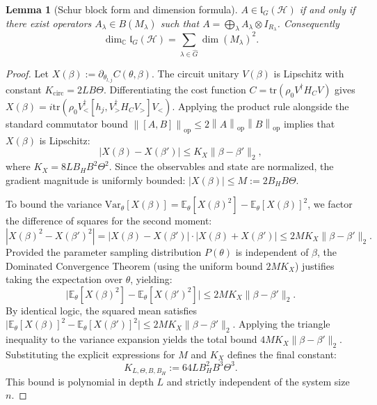 \documentclass[10pt,twocolumn]{article}
\newtheorem{lemma}[definition]{Lemma}
\theoremstyle{remark}
\newcommand{\Hil}{\mathcal{H}}
\newcommand{\lG}{\mathfrak{l}_G(\Hil)}
\newcommand{\opnorm}[1]{\left\lVert #1 \right\rVert_{\mathrm{op}}}
\begin{document}
\begin{lemma}[Schur block form and dimension formula]
\label{lem:schur}
$A \in \lG$ if and only if there exist operators $A_\lambda \in B(M_\lambda)$ such that $A = \bigoplus_\lambda A_\lambda \otimes I_{R_\lambda}$. Consequently
\begin{equation}
\dim_{\mathbb{C}} \lG = \sum_{\lambda \in \hat G} \dim(M_\lambda)^2. \label{eq:2}
\end{equation}
\end{lemma}
\begin{proof}
Let $X(\beta) := \partial_{\theta_{l,j}} C(\theta,\beta)$. The circuit unitary $V(\beta)$ is Lipschitz with constant $K_{\text{circ}} = 2LB\Theta$. Differentiating the cost function $C = \mathrm{tr}(\rho_0 V^\dagger H_C V)$ gives $X(\beta) = i \mathrm{tr}(\rho_0 V_{<}^\dagger [h_j, V_{>}^\dagger H_C V_{>}] V_{<})$. Applying the product rule alongside the standard commutator bound $\opnorm{[A,B]} \le 2\opnorm{A}\opnorm{B}$ implies that $X(\beta)$ is Lipschitz:
\begin{equation*}
|X(\beta) - X(\beta')| \le K_X \lVert \beta - \beta' \rVert_2,
\end{equation*}
where $K_X = 8 L B_H B^2 \Theta^2$. 
Since the observables and state are normalized, the gradient magnitude is uniformly bounded: $|X(\beta)| \le M := 2 B_H B \Theta$.

To bound the variance $\mathrm{Var}_\theta[X(\beta)] = \mathbb{E}_\theta[X(\beta)^2] - \mathbb{E}_\theta[X(\beta)]^2$, we factor the difference of squares for the second moment:
\begin{equation*}
|X(\beta)^2 - X(\beta')^2| = |X(\beta) - X(\beta')| \cdot |X(\beta) + X(\beta')| \le 2M K_X \lVert \beta - \beta' \rVert_2.
\end{equation*}
Provided the parameter sampling distribution $P(\theta)$ is independent of $\beta$, the Dominated Convergence Theorem (using the uniform bound $2M K_X$) justifies taking the expectation over $\theta$, yielding:
\begin{equation*}
\big|\mathbb{E}_\theta[X(\beta)^2] - \mathbb{E}_\theta[X(\beta')^2]\big| \le 2M K_X \lVert \beta - \beta' \rVert_2.
\end{equation*}
By identical logic, the squared mean satisfies $\big|\mathbb{E}_\theta[X(\beta)]^2 - \mathbb{E}_\theta[X(\beta')]^2\big| \le 2M K_X \lVert \beta - \beta' \rVert_2$.
Applying the triangle inequality to the variance expansion yields the total bound $4M K_X \lVert \beta - \beta' \rVert_2$. Substituting the explicit expressions for $M$ and $K_X$ defines the final constant:
\begin{equation*}
K_{L,\Theta,B,B_H} := 64 L B_H^2 B^3 \Theta^3.
\end{equation*}
This bound is polynomial in depth $L$ and strictly independent of the system size $n$.
\end{proof}
\end{document}
